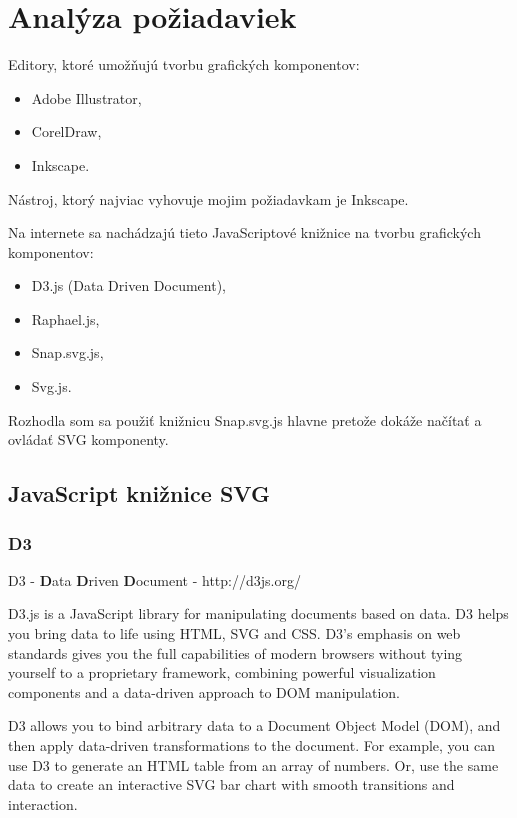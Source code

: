 \chapter{Analýza požiadaviek}

Editory, ktoré umožňujú tvorbu grafických komponentov: 

\begin{itemize}
\item Adobe Illustrator, 
\item CorelDraw, 
\item Inkscape.
\end{itemize}

Nástroj, ktorý najviac vyhovuje mojim požiadavkam je Inkscape. 


Na internete sa nachádzajú tieto JavaScriptové knižnice na tvorbu grafických komponentov: 
\begin{itemize}
\item D3.js (Data Driven Document), 
\item Raphael.js, 
\item Snap.svg.js,  
\item Svg.js. 
\end{itemize}
Rozhodla som sa použiť knižnicu Snap.svg.js hlavne pretože dokáže načítať a ovládať SVG komponenty.



\section{JavaScript knižnice SVG}

\subsection{D3}
D3  - \textbf{D}ata \textbf{D}riven \textbf{D}ocument -  http://d3js.org/

D3.js is a JavaScript library for manipulating documents based on data. D3 helps you bring data to life using HTML, SVG and CSS. D3’s emphasis on web standards gives you the full capabilities of modern browsers without tying yourself to a proprietary framework, combining powerful visualization components and a data-driven approach to DOM manipulation. 

D3 allows you to bind arbitrary data to a Document Object Model (DOM), and then apply data-driven transformations to the document. For example, you can use D3 to generate an HTML table from an array of numbers. Or, use the same data to create an interactive SVG bar chart with smooth transitions and interaction.

